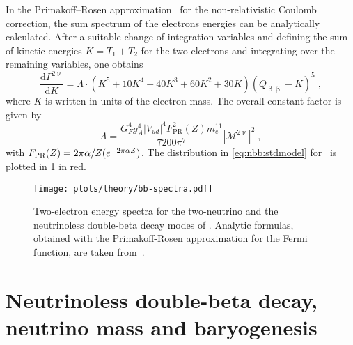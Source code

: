 In the Primakoff–Rosen approximation~\cite{Primakoff1959} for the non-relativistic Coulomb
correction, the sum spectrum of the electrons energies can be analytically calculated.
After a suitable change of integration variables and defining the sum of kinetic energies
$K=T_1+T_2$ for the two electrons and integrating over the remaining variables, one obtains
\begin{equation}\label{eq:nbb:stdmodel}
  \frac{\text{d}\Gamma^{2\upnu}}{\text{d}K} =
  \Lambda \cdot (K^5+10K^4+40K^3+60K^2+30K) {(Q_{\upbeta\upbeta}-K)}^5 \;,
\end{equation}
where $K$ is written in units of the electron mass. The overall constant factor is given
by
\[
  \Lambda = \frac{G_F^4g_A^4|V_{ud}|^4F^2_\text{PR}(Z)m_e^{11}}{7200\pi^7}
            |\mathcal{M}^{2\upnu}|^2 \;,
\]
with $F_\text{PR}(Z) = 2\pi\alpha/Z(\-e^{-2\pi\alpha Z})$. The distribution in
\cref{eq:nbb:stdmodel} for \gesix\ is plotted in \cref{fig:nbb:spectra} in red.

\begin{figure}
  \centering
  \texttt{[image: plots/theory/bb-spectra.pdf]}
  \caption{%
    Two-electron energy spectra for the two-neutrino and the neutrinoless
    double-beta decay modes of \gesix. Analytic formulas, obtained with the
    Primakoff-Rosen approximation for the Fermi function, are taken
    from~\cite{Tretyak1995, Tretyak2002}.
  }\label{fig:nbb:spectra}
\end{figure}

\section{Neutrinoless double-beta decay, neutrino mass and baryogenesis}%
\label{sec:nbb:0nbb}

